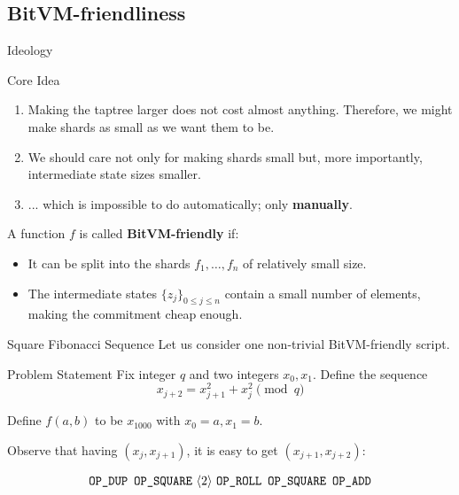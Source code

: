 \documentclass{zkdl-presentation-template}
\newcommand{\elem}[1]{\, \langle #1 \rangle \,}
\newcommand{\opcode}[1]{\, \texttt{#1} \,}
\begin{document}
    \subsection{BitVM-friendliness}
    \begin{frame}{Ideology}
        \begin{block}{Core Idea}
            \begin{enumerate}
                \item Making the taptree larger does not cost almost anything. Therefore, we might make shards as small as we want them to be.
                \item We should care not only for making shards small but, more importantly, intermediate state sizes smaller.
                \item ... which is impossible to do automatically; only \textbf{manually}.
            \end{enumerate}
        \end{block}

        \begin{definition}
          A function $f$ is called \textbf{BitVM-friendly} if:
          \begin{itemize}
            \item It can be split into the shards $f_1,\dots,f_n$ of relatively small size.
            \item The intermediate states $\{z_j\}_{0 \leq j \leq n}$ contain a small number of elements, making the commitment cheap enough.
          \end{itemize}
        \end{definition}
    \end{frame}

    \begin{frame}{Square Fibonacci Sequence}
        Let us consider one non-trivial BitVM-friendly script.
    
        \begin{block}{Problem Statement}
            Fix integer $q$ and two integers $x_0,x_1$. Define the sequence
            \begin{equation*}
                x_{j+2} = x_{j+1}^2 + x_j^2 \pmod{q}
            \end{equation*}

            Define $f(a,b)$ to be $x_{1000}$ with $x_0 = a, x_1=b$.
        \end{block}

        Observe that having $(x_j,x_{j+1})$, it is easy to get $(x_{j+1},x_{j+2})$:
        \begin{empheqboxed}
            \small
          \begin{align*}
            \opcode{\texttt{OP\_DUP}} \, \opcode{\texttt{OP\_SQUARE}} \elem{2} \opcode{\texttt{OP\_ROLL}} \, \opcode{\texttt{OP\_SQUARE}} \, \opcode{\texttt{OP\_ADD}}
          \end{align*}
        \end{empheqboxed}
    \end{frame}
\end{document}
